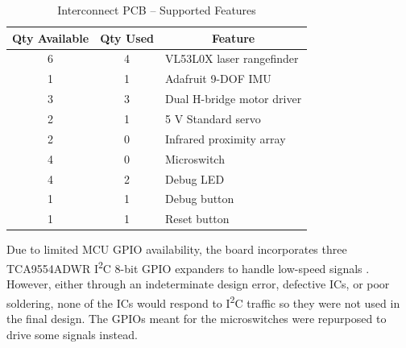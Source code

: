 \begin{table}[h]
	\centering	\caption{Interconnect PCB -- Supported Features}	\label{tab:interconnect_features}
	\begin{tabular}{ccl}
		\toprule 
		Qty Available & Qty Used & \multicolumn{1}{c}{Feature} \\ 
		\midrule 
		6 & 4 & VL53L0X laser rangefinder \\ 
		1 & 1 & Adafruit 9-DOF IMU \\ 
		3 & 3 & Dual H-bridge motor driver \\
		2 & 1 & 5 V Standard servo \\ 
		2 & 0 & Infrared proximity array \\
		4 & 0 & Microswitch \\ 
		4 & 2 & Debug LED \\ 
		1 & 1 & Debug button \\
		1 & 1 & Reset button \\ 
		\bottomrule
	\end{tabular} 
\end{table}
Due to limited MCU GPIO availability, the board incorporates three TCA9554ADWR I\textsuperscript{2}C 8-bit GPIO expanders to handle low-speed signals \cite{TCA9554ADWR}. However, either through an indeterminate design error, defective ICs, or poor soldering, none of the ICs would respond to I\textsuperscript{2}C traffic so they were not used in the final design. The GPIOs meant for the microswitches were repurposed to drive some signals instead.

